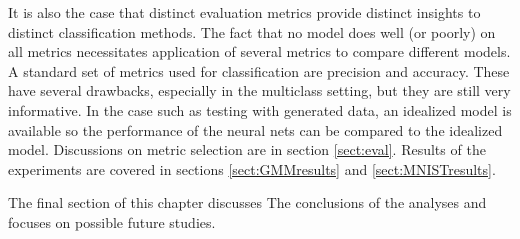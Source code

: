It is also the case that distinct evaluation metrics provide distinct insights to distinct classification methods. The fact that no model does well (or poorly) on all metrics necessitates application of several metrics to compare different models. A standard set of metrics used for classification are precision and accuracy. These have several drawbacks, especially in the multiclass setting, but they are still very informative. In the case such as testing with generated data, an idealized model is available so the performance of the neural nets can be compared to the idealized model. Discussions on metric selection are in section \ref{sect:eval}. Results of the experiments are covered in sections \ref{sect:GMMresults} and \ref{sect:MNISTresults}.

The final section of this chapter discusses The conclusions of the analyses and focuses on possible future studies.